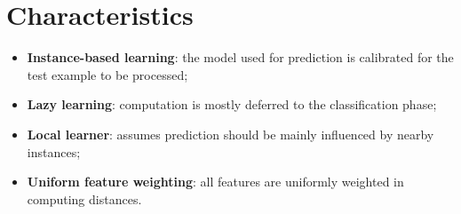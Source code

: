 \section{Characteristics}
\begin{itemize}
	\item \textbf{Instance-based learning}: the model used for prediction is calibrated for the test example to be processed;
	\item \textbf{Lazy learning}: computation is mostly deferred to the classification phase;
	\item \textbf{Local learner}: assumes prediction should be mainly influenced by nearby instances;
	\item \textbf{Uniform feature weighting}: all features are uniformly weighted in computing distances.
\end{itemize}























